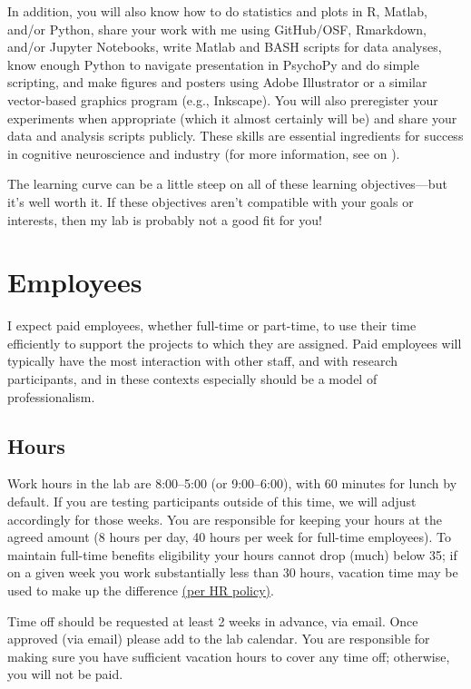 \documentclass[letterpaper,12pt,oneside]{memoir}
\begin{document}
In addition, you will also know how to do statistics and plots in R, Matlab, and/or Python, share your work with me using GitHub/OSF, Rmarkdown, and/or Jupyter Notebooks, write Matlab and BASH scripts for data analyses, know enough Python to navigate presentation in PsychoPy and do simple scripting, and make figures and posters using Adobe Illustrator or a similar vector-based graphics program (e.g., Inkscape). You will also preregister your experiments when appropriate (which it almost certainly will be) and share your data and analysis scripts publicly. These skills are essential ingredients for success in cognitive neuroscience and industry (for more information, see  on ).

The learning curve can be a little steep on all of these learning objectives---but it's well worth it. If these objectives aren't compatible with your goals or interests, then my lab is probably not a good fit for you!



\section{Employees}

I expect paid employees, whether full-time or part-time, to use their time efficiently to support the projects to which they are assigned. Paid employees will typically have the most interaction with other staff, and with research participants, and in these contexts especially should be a model of professionalism.

\subsection{Hours}
Work hours in the lab are 8:00--5:00 (or 9:00--6:00), with 60 minutes for lunch by default. If you are testing participants outside of this time, we will adjust accordingly for those weeks. You are responsible for keeping your hours at the agreed amount (8 hours per day, 40 hours per week for full-time employees). To maintain full-time benefits eligibility your hours cannot drop (much) below 35; if on a given week you work substantially less than 30 hours, vacation time may be used to make up the difference \href{http://www.temple.edu/hr/departments/employeerelations/documents/Employee_Manual_Feb_2016.pdf}{(per HR policy)}.

Time off should be requested at least 2 weeks in advance, via email. Once approved (via email) please add to the lab calendar. You are responsible for making sure you have sufficient vacation hours to cover any time off; otherwise, you will not be paid.
\end{document}
